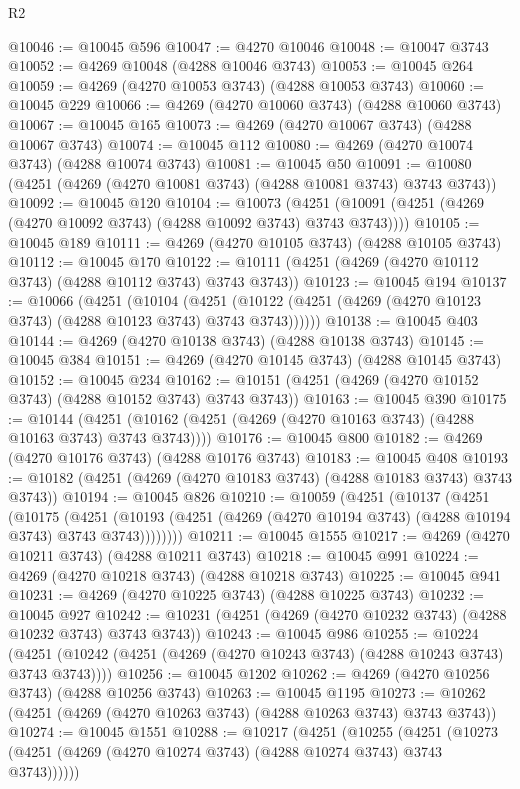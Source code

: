 \begin{lexlean}{R2}
\begin{coremodule}
@10046 := @10045 @596
@10047 := @4270 @10046
@10048 := @10047 @3743
@10052 := @4269 @10048 (@4288 @10046 @3743)
@10053 := @10045 @264
@10059 := @4269 (@4270 @10053 @3743) (@4288 @10053 @3743)
@10060 := @10045 @229
@10066 := @4269 (@4270 @10060 @3743) (@4288 @10060 @3743)
@10067 := @10045 @165
@10073 := @4269 (@4270 @10067 @3743) (@4288 @10067 @3743)
@10074 := @10045 @112
@10080 := @4269 (@4270 @10074 @3743) (@4288 @10074 @3743)
@10081 := @10045 @50
@10091 := @10080 (@4251 (@4269 (@4270 @10081 @3743) (@4288 @10081 @3743) @3743 @3743))
@10092 := @10045 @120
@10104 := @10073
    (@4251 (@10091 (@4251 (@4269 (@4270 @10092 @3743) (@4288 @10092 @3743) @3743 @3743))))
@10105 := @10045 @189
@10111 := @4269 (@4270 @10105 @3743) (@4288 @10105 @3743)
@10112 := @10045 @170
@10122 := @10111 (@4251 (@4269 (@4270 @10112 @3743) (@4288 @10112 @3743) @3743 @3743))
@10123 := @10045 @194
@10137 := @10066
    (@4251
      (@10104
        (@4251 (@10122 (@4251 (@4269 (@4270 @10123 @3743) (@4288 @10123 @3743) @3743 @3743))))))
@10138 := @10045 @403
@10144 := @4269 (@4270 @10138 @3743) (@4288 @10138 @3743)
@10145 := @10045 @384
@10151 := @4269 (@4270 @10145 @3743) (@4288 @10145 @3743)
@10152 := @10045 @234
@10162 := @10151 (@4251 (@4269 (@4270 @10152 @3743) (@4288 @10152 @3743) @3743 @3743))
@10163 := @10045 @390
@10175 := @10144
    (@4251 (@10162 (@4251 (@4269 (@4270 @10163 @3743) (@4288 @10163 @3743) @3743 @3743))))
@10176 := @10045 @800
@10182 := @4269 (@4270 @10176 @3743) (@4288 @10176 @3743)
@10183 := @10045 @408
@10193 := @10182 (@4251 (@4269 (@4270 @10183 @3743) (@4288 @10183 @3743) @3743 @3743))
@10194 := @10045 @826
@10210 := @10059
    (@4251
      (@10137
        (@4251
          (@10175
            (@4251
              (@10193 (@4251 (@4269 (@4270 @10194 @3743) (@4288 @10194 @3743) @3743 @3743))))))))
@10211 := @10045 @1555
@10217 := @4269 (@4270 @10211 @3743) (@4288 @10211 @3743)
@10218 := @10045 @991
@10224 := @4269 (@4270 @10218 @3743) (@4288 @10218 @3743)
@10225 := @10045 @941
@10231 := @4269 (@4270 @10225 @3743) (@4288 @10225 @3743)
@10232 := @10045 @927
@10242 := @10231 (@4251 (@4269 (@4270 @10232 @3743) (@4288 @10232 @3743) @3743 @3743))
@10243 := @10045 @986
@10255 := @10224
    (@4251 (@10242 (@4251 (@4269 (@4270 @10243 @3743) (@4288 @10243 @3743) @3743 @3743))))
@10256 := @10045 @1202
@10262 := @4269 (@4270 @10256 @3743) (@4288 @10256 @3743)
@10263 := @10045 @1195
@10273 := @10262 (@4251 (@4269 (@4270 @10263 @3743) (@4288 @10263 @3743) @3743 @3743))
@10274 := @10045 @1551
@10288 := @10217
    (@4251
      (@10255
        (@4251 (@10273 (@4251 (@4269 (@4270 @10274 @3743) (@4288 @10274 @3743) @3743 @3743))))))

\end{coremodule}
\end{lexlean}
